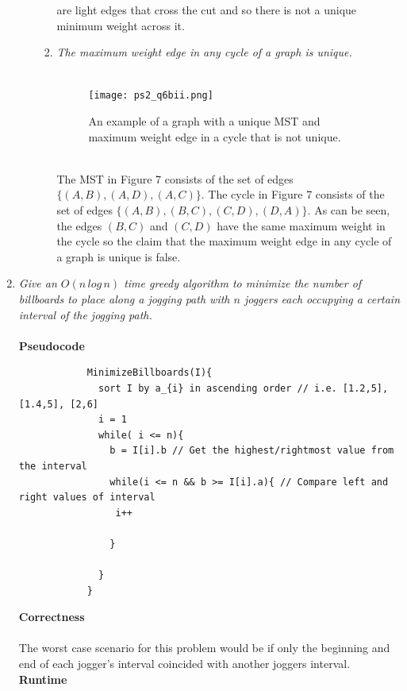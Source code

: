 \documentclass[12pt]{article}
\begin{document}
\begin{enumerate}
\begin{enumerate}
\begin{enumerate}
						are light edges that cross the cut and so there is not a unique minimum weight across it.\\
						\item \textit{The maximum weight edge in any cycle of a graph is unique.}\\
						\\
						\begin{figure}[h]
						\caption{An example of a graph with a unique MST and maximum weight edge in a cycle that is not unique.}
						\texttt{[image: ps2\_q6bii.png]}
						\centering
						\end{figure}
						\\
						The MST in Figure 7 consists of the set of edges $\{(A,B),(A,D),(A,C)\}$.  The cycle in Figure 7 consists of the set of edges $\{(A,B),(B,C),(C,D),(D,A)\}$.  
						As can be seen, the edges $(B,C)$ and $(C,D)$ have the same maximum weight in the cycle so the claim that the maximum weight edge in any cycle of a graph is unique is false.  
					\end{enumerate}
			\end{enumerate}
			
			\item \textit{Give an $O(n\,log\,n)$ time greedy algorithm to minimize the number of billboards to place along a jogging path with $n$ joggers each occupying a certain interval of the jogging path.}\\
			\\
			\textbf{Pseudocode}\\
			\begin{verbatim}
			MinimizeBillboards(I){
			  sort I by a_{i} in ascending order // i.e. [1.2,5], [1.4,5], [2,6]
			  i = 1
			  while( i <= n){
			    b = I[i].b // Get the highest/rightmost value from the interval
			    while(i <= n && b >= I[i].a){ // Compare left and right values of interval
			     i++ 
			      
			    }
			    
			  }
			}
			\end{verbatim}
			\textbf{Correctness}\\
			\\
			The worst case scenario for this problem would be if only the beginning and end of each jogger's interval coincided with another joggers interval.\\
			\textbf{Runtime}\\
			\\
	
\end{enumerate}
\end{document}
